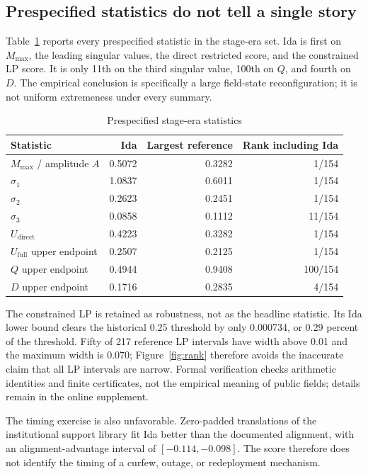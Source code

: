 \documentclass[11pt]{article}
\begin{document}
\subsection{Prespecified statistics do not tell a single story}

Table~\ref{tab:secondary} reports every prespecified statistic in the stage-era set. Ida is first on $M_{\max}$, the leading singular values, the direct restricted score, and the constrained LP score. It is only 11th on the third singular value, 100th on $Q$, and fourth on $D$. The empirical conclusion is specifically a large field-state reconfiguration; it is not uniform extremeness under every summary.

\begin{table}[t]
\centering
\caption{Prespecified stage-era statistics}
\label{tab:secondary}
\begin{tabular}{@{}lrrr@{}}
\toprule
Statistic & Ida & Largest reference & Rank including Ida \\
\midrule
$M_{\max}$ / amplitude $A$ & 0.5072 & 0.3282 & 1/154 \\
$\sigma_1$ & 1.0837 & 0.6011 & 1/154 \\
$\sigma_2$ & 0.2623 & 0.2451 & 1/154 \\
$\sigma_3$ & 0.0858 & 0.1112 & 11/154 \\
$U_{\mathrm{direct}}$ & 0.4223 & 0.3282 & 1/154 \\
$U_{\mathrm{full}}$ upper endpoint & 0.2507 & 0.2125 & 1/154 \\
$Q$ upper endpoint & 0.4944 & 0.9408 & 100/154 \\
$D$ upper endpoint & 0.1716 & 0.2835 & 4/154 \\
\bottomrule
\end{tabular}
\end{table}

The constrained LP is retained as robustness, not as the headline statistic. Its Ida lower bound clears the historical $0.25$ threshold by only 0.000734, or 0.29 percent of the threshold. Fifty of 217 reference LP intervals have width above 0.01 and the maximum width is 0.070; Figure~\ref{fig:rank} therefore avoids the inaccurate claim that all LP intervals are narrow. Formal verification checks arithmetic identities and finite certificates, not the empirical meaning of public fields; details remain in the online supplement.

The timing exercise is also unfavorable. Zero-padded translations of the institutional support library fit Ida better than the documented alignment, with an alignment-advantage interval of $[-0.114,-0.098]$. The score therefore does not identify the timing of a curfew, outage, or redeployment mechanism.
\end{document}
